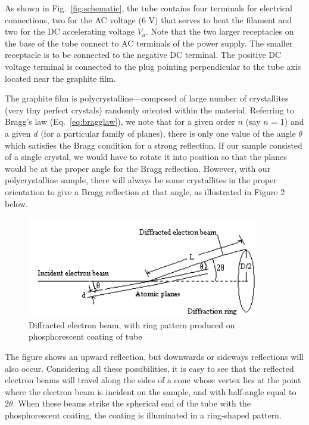 \documentclass{tufte-handout}
\begin{document}
As shown in Fig.~\ref{fig:schematic}, the tube contains four terminals for electrical
connections, two for the AC voltage (6 V) that serves to heat the
filament and two for the DC accelerating voltage $V_a$.
 Note that the two larger receptacles on the base of the tube connect
to AC terminals of the power supply.  The smaller receptacle is to be
connected to the negative DC terminal.  The positive DC voltage
terminal is connected to the plug pointing perpendicular to the tube
axis located near the graphite film.

The graphite film is polycrystalline---composed of large number of crystallites
(very tiny perfect crystals) randomly oriented within the material.  Referring
to Bragg's law (Eq.~\ref{eq:bragglaw}), we note that for a given order $n$ (say
$n$ = 1) and a given $d$ (for a particular family of planes), there is only one
value of the angle ${\theta}$ which satisfies the Bragg condition for a strong
reflection.  If our sample consisted of a single crystal, we would have to
rotate it into position so that the planes would be at the proper angle for the
Bragg reflection.  However, with our polycrystalline sample, there will always
be some crystallites in the proper orientation to give a Bragg reflection at
that angle, as illustrated in Figure 2 below.
\begin{figure}
\begin{centering}
\includegraphics[width=4in]{../images/ediffraction-img2.png}
\caption{Diffracted electron beam, with ring pattern produced on phosphorescent coating of tube}
\label{fig:rings}
\end{centering}
\end{figure}

The figure shows an upward reflection, but downwards or sideways
reflections will also occur. Considering all these possibilities, it is
easy to see that the reflected electron beams will travel along the
sides of a cone whose vertex lies at the point where the electron beam
is incident on the sample, and with half-angle equal to $2{\theta}$.
 When these beams strike the spherical end of the tube with the
phosphorescent coating, the coating is illuminated in a ring-shaped
pattern.
\end{document}
